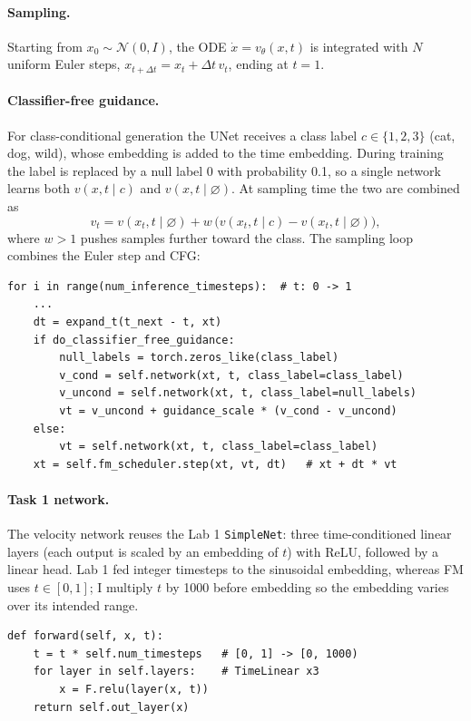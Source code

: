 \paragraph{Sampling.}
Starting from $x_0\sim\mathcal N(0,I)$, the ODE $\dot x=v_\theta(x,t)$ is integrated with $N$ uniform Euler steps, $x_{t+\Delta t}=x_t+\Delta t\,v_t$, ending at $t=1$.

\paragraph{Classifier-free guidance.}
For class-conditional generation the UNet receives a class label $c\in\{1,2,3\}$ (cat, dog, wild), whose embedding is added to the time embedding.
During training the label is replaced by a null label $0$ with probability 0.1, so a single network learns both $v(x,t\mid c)$ and $v(x,t\mid\varnothing)$.
At sampling time the two are combined as
\begin{equation}
  v_t = v(x_t,t\mid\varnothing) + w\,\big(v(x_t,t\mid c)-v(x_t,t\mid\varnothing)\big),
  \label{eq:cfg}
\end{equation}
where $w>1$ pushes samples further toward the class.
The sampling loop combines the Euler step and CFG:
\begin{lstlisting}
for i in range(num_inference_timesteps):  # t: 0 -> 1
    ...
    dt = expand_t(t_next - t, xt)
    if do_classifier_free_guidance:
        null_labels = torch.zeros_like(class_label)
        v_cond = self.network(xt, t, class_label=class_label)
        v_uncond = self.network(xt, t, class_label=null_labels)
        vt = v_uncond + guidance_scale * (v_cond - v_uncond)
    else:
        vt = self.network(xt, t, class_label=class_label)
    xt = self.fm_scheduler.step(xt, vt, dt)   # xt + dt * vt
\end{lstlisting}

\paragraph{Task 1 network.}
The velocity network reuses the Lab 1 \texttt{SimpleNet}: three time-conditioned linear layers (each output is scaled by an embedding of $t$) with ReLU, followed by a linear head.
Lab 1 fed integer timesteps to the sinusoidal embedding, whereas FM uses $t\in[0,1]$; I multiply $t$ by 1000 before embedding so the embedding varies over its intended range.
\begin{lstlisting}
def forward(self, x, t):
    t = t * self.num_timesteps   # [0, 1] -> [0, 1000)
    for layer in self.layers:    # TimeLinear x3
        x = F.relu(layer(x, t))
    return self.out_layer(x)
\end{lstlisting}

